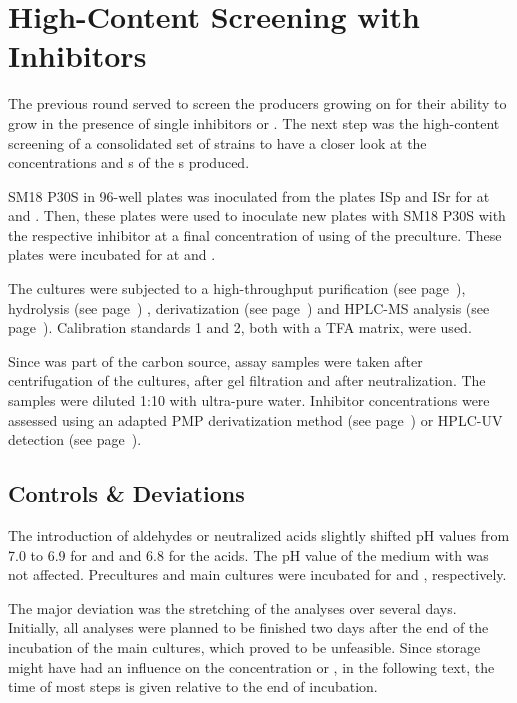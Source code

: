 \section{High-Content Screening with Inhibitors\label{sec-inh-hcs}}
The previous round served to screen the \eps{} producers growing on \xyl{} for their ability to grow in the presence of single inhibitors or \lch{}. The next step was the high-content screening of a consolidated set of strains to have a closer look at the \eps{} concentrations and \amc{}s of the \eps{}s produced.

 SM18 P30S in 96-well plates was inoculated from the plates ISp and ISr for  at  and . Then, these plates were used to inoculate new plates with  SM18 P30S with the respective inhibitor at a final concentration of  using  of the preculture. These plates were incubated for  at  and .

The cultures were subjected to a high-throughput \eps{} purification (see page~\pageref{hteps-purification}), hydrolysis (see page~\pageref{pmp-hydrolysis}) %
, derivatization (see page~\pageref{pmp-deriv}) and HPLC-MS analysis (see page~\pageref{pmp-hplc-ms}). Calibration standards 1 and 2, both with a TFA matrix, were used.

Since \glc{} was part of the carbon source, \glc{} assay samples were taken after centrifugation of the cultures, after gel filtration and after neutralization. The samples were diluted 1:10 with ultra-pure water. Inhibitor concentrations were assessed using an adapted PMP derivatization method (see page~\pageref{subsec-inh-ald}) or HPLC-UV detection (see page~\pageref{subsec-inh-acid}).

\subsection{Controls \& Deviations\label{subsec-inh-hcs-controls}}
The introduction of aldehydes or neutralized acids slightly shifted pH values from \num{7.0} to \num{6.9} for \fur{} and \van{} and \num{6.8} for the acids. The pH value of the medium with \hmf{} was not affected. Precultures and main cultures were incubated for  and , respectively.

The major deviation was the stretching of the analyses over several days. Initially, all analyses were planned to be finished two days after the end of the incubation of the main cultures, which proved to be unfeasible. Since storage might have had an influence on the \eps{} concentration or \amc{}, in the following text, the time of most steps is given relative to the end of incubation.

